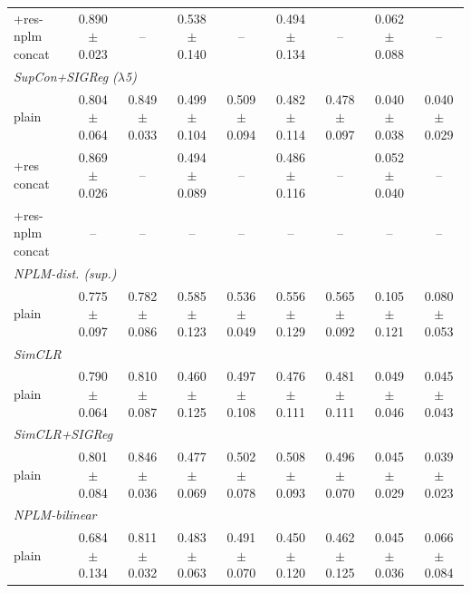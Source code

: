 \begin{landscape}
\begin{center}
\begin{longtable}{lcccccccc}
\quad +res-nplm concat & 0.890$\pm$0.023 & -- & 0.538$\pm$0.140 & -- & 0.494$\pm$0.134 & -- & 0.062$\pm$0.088 & -- \\
\multicolumn{9}{l}{\emph{SupCon+SIGReg ($\lambda$5)}} \\
\quad plain & 0.804$\pm$0.064 & 0.849$\pm$0.033 & 0.499$\pm$0.104 & 0.509$\pm$0.094 & 0.482$\pm$0.114 & 0.478$\pm$0.097 & 0.040$\pm$0.038 & 0.040$\pm$0.029 \\
\quad +res concat & 0.869$\pm$0.026 & -- & 0.494$\pm$0.089 & -- & 0.486$\pm$0.116 & -- & 0.052$\pm$0.040 & -- \\
\quad +res-nplm concat & -- & -- & -- & -- & -- & -- & -- & -- \\
\multicolumn{9}{l}{\emph{NPLM-dist. (sup.)}} \\
\quad plain & 0.775$\pm$0.097 & 0.782$\pm$0.086 & 0.585$\pm$0.123 & 0.536$\pm$0.049 & 0.556$\pm$0.129 & 0.565$\pm$0.092 & 0.105$\pm$0.121 & 0.080$\pm$0.053 \\
\multicolumn{9}{l}{\emph{SimCLR}} \\
\quad plain & 0.790$\pm$0.064 & 0.810$\pm$0.087 & 0.460$\pm$0.125 & 0.497$\pm$0.108 & 0.476$\pm$0.111 & 0.481$\pm$0.111 & 0.049$\pm$0.046 & 0.045$\pm$0.043 \\
\multicolumn{9}{l}{\emph{SimCLR+SIGReg}} \\
\quad plain & 0.801$\pm$0.084 & 0.846$\pm$0.036 & 0.477$\pm$0.069 & 0.502$\pm$0.078 & 0.508$\pm$0.093 & 0.496$\pm$0.070 & 0.045$\pm$0.029 & 0.039$\pm$0.023 \\
\multicolumn{9}{l}{\emph{NPLM-bilinear}} \\
\quad plain & 0.684$\pm$0.134 & 0.811$\pm$0.032 & 0.483$\pm$0.063 & 0.491$\pm$0.070 & 0.450$\pm$0.120 & 0.462$\pm$0.125 & 0.045$\pm$0.036 & 0.066$\pm$0.084 \\
\end{longtable}
\end{center}
\end{landscape}

